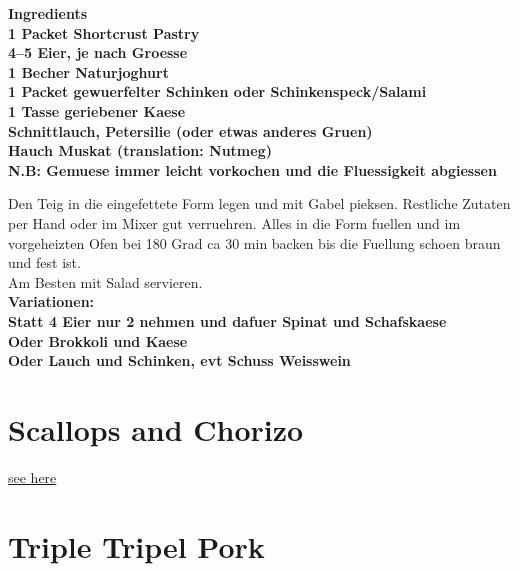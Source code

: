 \documentclass[18pt, oneside]{book}
\begin{document}
\bf{Ingredients} \normalfont \\
1 Packet Shortcrust Pastry \\
4--5 Eier, je nach Groesse \\
1 Becher Naturjoghurt \\
1 Packet gewuerfelter Schinken oder Schinkenspeck/Salami \\
1 Tasse geriebener Kaese \\
Schnittlauch, Petersilie (oder etwas anderes Gruen) \\
Hauch Muskat (translation: Nutmeg)\\

\bf N.B: Gemuese immer leicht vorkochen und die Fluessigkeit abgiessen \\
\normalfont

Den Teig in die eingefettete Form legen und mit Gabel pieksen. Restliche Zutaten per Hand oder im Mixer gut verruehren. Alles in die Form fuellen und im vorgeheizten Ofen bei 180 Grad ca 30 min backen bis die Fuellung schoen braun und fest ist. \\

Am Besten mit Salad servieren. \\

\bf{Variationen:} \normalfont \\
Statt 4 Eier nur 2 nehmen und dafuer Spinat und Schafskaese \\
Oder Brokkoli und Kaese \\
Oder Lauch und Schinken, evt Schuss Weisswein \\

\section{Scallops and Chorizo}
\hyperref[scallopsandchorizo]{see here} \\ 

\section{Triple Tripel Pork}
\end{document}
